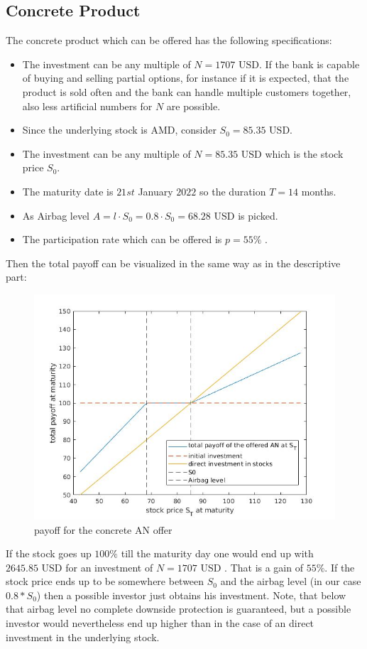 \documentclass[11pt,oneside,a4paper]{article}
\begin{document}
	\subsection{Concrete Product}
	The concrete product which can be offered has the following specifications:
	\begin{itemize}
		\item The investment can be any multiple of $ N = 1707 \text{ USD} $. If the bank is capable of buying and selling partial options, for instance if it is expected, that the product is sold often and the bank can handle multiple customers together, also less artificial numbers for $ N $ are possible. 
		\item Since the underlying stock is AMD, consider $ S_0 = 85.35 \text{ USD} $.
		\item The investment can be any multiple of $ N = 85.35 \text{ USD} $ which is the stock price $ S_0 $.
		\item The maturity date is $ 21st $ January $ 2022 $ so the duration $ T = 14 $ months.
		\item As Airbag level $ A = l \cdot S_0 = 0.8 \cdot S_0  = 68.28 \text{ USD} $ is picked.
		\item The participation rate which can be offered is $ p = 55 \% $ .
	\end{itemize}
	Then the total payoff can be visualized in the same way as in the descriptive part:
	\begin{figure}[H]
		\centering
		\includegraphics[width=0.8\linewidth]{AN_concrete.jpg}
		\caption{payoff for the concrete AN offer}
	\end{figure}
	If the stock goes up $ 100 \% $ till the maturity day one would end up with $ 2645.85 \text{ USD}$ for an investment of  $ N = 1707 \text{ USD} $ . That is a gain of $ 55 \% $. If the stock price ends up to be somewhere between $ S_0 $ and the airbag level (in our case $ 0.8 * S_0 $) then a possible investor just obtains his investment. Note, that below that airbag level no complete downside protection is guaranteed, but a possible investor would nevertheless end up higher than in the case of an direct investment in the underlying stock.
\end{document}
